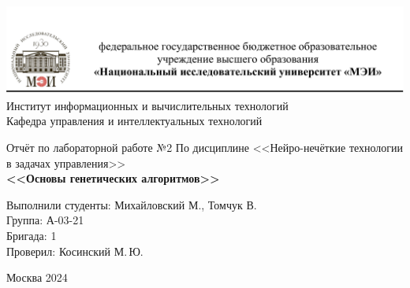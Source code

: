 \begin{titlepage}
	\newpage
	\begin{center}
		\includegraphics[width=\textwidth]{png/tit.png}
		Институт информационных и вычислительных технологий \\
			Кафедра управления и интеллектуальных технологий
		\vspace{1.25cm}
	\end{center}
	
	\vspace{1.2em}
	
	\begin{center}
		\begin{spacing}{1}
			{\Large Отчёт по лабораторной работе №2 \linebreak
			По дисциплине <<Нейро-нечёткие технологии в задачах управления>> \\}
			\large{\bf<<Основы генетических алгоритмов>>}
		\end{spacing}
	\end{center}
	
	\vspace{5em}
	

	\vspace{6em}
	
		\noindent Выполнили студенты: Михайловский М., Томчук В. \\
		Группа: А-03-21 \\
		Бригада: 1\\
		Проверил: Косинский М.\,Ю.
	
	
	\vspace{\fill}
	
	\begin{center}
		Москва 2024
	\end{center}
	
\end{titlepage}